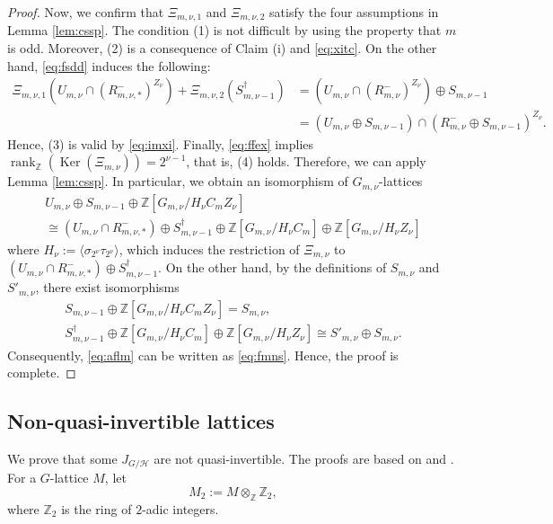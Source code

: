 \documentclass[12pt]{amsart}
\theoremstyle{plain}
\theoremstyle{definition}
\numberwithin{thm}{section}
\numberwithin{equation}{section}
\newcommand{\Z}{\mathbb{Z}}
\newcommand{\cH}{\mathcal{H}}
\DeclareMathOperator{\Ker}{Ker}
\DeclareMathOperator{\rk}{rank}
\begin{document}
\begin{proof}
Now, we confirm that $\Xi_{m,\nu,1}$ and $\Xi_{m,\nu,2}$ satisfy the four assumptions in Lemma \ref{lem:cssp}. The condition (1) is not difficult by using the property that $m$ is odd. Moreover, (2) is a consequence of Claim (i) and \eqref{eq:xitc}. On the other hand, \eqref{eq:fsdd} induces the following: 
\begin{align*}
\Xi_{m,\nu,1}(U_{m,\nu}\cap (R_{m,\nu,\ast}^{-})^{Z_{\nu}})+\Xi_{m,\nu,2}(S_{m,\nu-1}^{\dagger})&=(U_{m,\nu}\cap (R_{m,\nu}^{-})^{Z_{\nu}})\oplus S_{m,\nu-1}\\
&=(U_{m,\nu}\oplus S_{m,\nu-1})\cap (R_{m,\nu}^{-}\oplus S_{m,\nu-1})^{Z_{\nu}}. 
\end{align*}
Hence, (3) is valid by \eqref{eq:imxi}. Finally, \eqref{eq:ffex} implies $\rk_{\Z}(\Ker(\Xi_{m,\nu}))=2^{\nu-1}$, that is, (4) holds. Therefore, we can apply Lemma \ref{lem:cssp}. In particular, we obtain an isomorphism of $G_{m,\nu}$-lattices
\begin{equation}\label{eq:aflm}
\begin{gathered}
U_{m,\nu}\oplus S_{m,\nu-1}\oplus \Z[G_{m,\nu}/H_{\nu}C_{m}Z_{\nu}]
\\ \cong (U_{m,\nu}\cap R_{m,\nu,\ast}^{-})\oplus S_{m,\nu-1}^{\dagger}\oplus \Z[G_{m,\nu}/H_{\nu}C_{m}]\oplus \Z[G_{m,\nu}/H_{\nu}Z_{\nu}]
\end{gathered}
\end{equation}
where $H_{\nu}:=\langle \sigma_{2^{\nu}}\tau_{2^{\nu}}\rangle$, which induces the restriction of $\Xi_{m,\nu}$ to $(U_{m,\nu}\cap R_{m,\nu,\ast}^{-})\oplus S_{m,\nu-1}^{\dagger}$. On the other hand, by the definitions of $S_{m,\nu}$ and $S'_{m,\nu}$, there exist isomorphisms
\begin{gather*}
S_{m,\nu-1}\oplus \Z[G_{m,\nu}/H_{\nu}C_{m}Z_{\nu}]=S_{m,\nu},\\
S_{m,\nu-1}^{\dagger}\oplus \Z[G_{m,\nu}/H_{\nu}C_{m}]\oplus \Z[G_{m,\nu}/H_{\nu}Z_{\nu}]
\cong S'_{m,\nu}\oplus S_{m,\nu}.
\end{gather*}
Consequently, \eqref{eq:aflm} can be written as \eqref{eq:fmns}. Hence, the proof is complete. 
\end{proof}

\subsection{Non-quasi-invertible lattices}

We prove that some $J_{G/\cH}$ are not quasi-invertible. The proofs are based on \cite[\S\S 3--4]{Endo2001} and \cite[Lemma 2.2]{Endo2011}. For a $G$-lattice $M$, let 
\begin{equation*}
M_{2}:=M\otimes_{\Z}\Z_{2},
\end{equation*}
where $\Z_{2}$ is the ring of $2$-adic integers.
\end{document}
